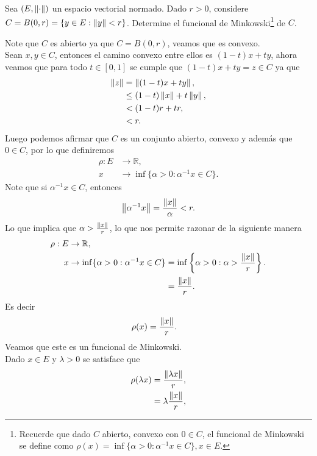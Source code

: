 \begin{homeworkProblem}
  Sea $(E,\left\|\cdot\right\|)$ un espacio vectorial normado. Dado $r>0$, considere $C=B(0,r)=\{y\in E:\left\|y\right\|<r\}$. Determine el funcional de Minkowski\footnote{Recuerde que dado $C$ abierto, convexo con $0\in C$, el funcional de Minkowski se define como $\rho(x)=\inf\{\alpha>0: \alpha^{-1}x\in C\},x\in E$.} de $C$.
  \begin{solution}
    Note que $C$ es abierto ya que $C=B(0,r)$, veamos que es convexo.\\
    Sean $x,y\in C$, entonces el camino convexo entre ellos es $(1-t)x+ty$, ahora veamos que para todo $t\in[0,1]$ se cumple que $(1-t)x+ty=z\in C$ ya que
    \begin{align*}
      \left\|z\right\|&=\left\|(1-t)x+ty\right\|,\\
      &\leq(1-t)\left\|x\right\|+t\left\|y\right\|,\\
      &<(1-t)r+tr,\\
      &<r.
    \end{align*}
    Luego podemos afirmar que $C$ es un conjunto abierto, convexo y además que $0\in C$, por lo que definiremos 
    \begin{align*}
      \rho:E &\to \mathbb{R},\\
      x &\to\inf\{\alpha>0:\alpha^{-1}x\in C\}.
    \end{align*}
    Note que si $\alpha^{-1}x\in C$, entonces
    \begin{align*}
      \left\|\alpha^{-1}x\right\|=\frac{\left\|x\right\|}{\alpha}< r. 
    \end{align*}
    Lo que implica que $\alpha>\frac{\left\|x\right\|}{r}$, lo que nos permite razonar de la siguiente manera
    \begin{align*}
      \rho:E &\to \mathbb{R},\\
      x &\to\inf\{\alpha>0:\alpha^{-1}x\in C\}=\inf\left\{\alpha>0:\alpha>\frac{\norm{x}}{r}\right\}.\\
      &\hspace{4cm}=\frac{\norm{x}}{r}.
    \end{align*}
    Es decir
    \begin{align*}
      \rho(x)&=\frac{\left\|x\right\|}{r}.
    \end{align*}
    Veamos que este es un funcional de Minkowski.\\
    Dado $x\in E$ y $\lambda>0$ se satisface que
    \begin{align*}
      \rho(\lambda x)&=\frac{\norm{\lambda x}}{r},\\
      & =\lambda \frac{\norm{x}}{r},\\

\end{align*}
\end{solution}
\end{homeworkProblem}
